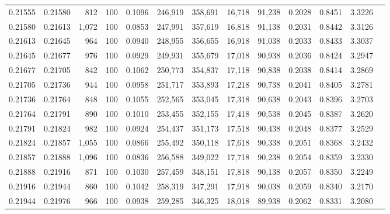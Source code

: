 \begin{tabular}{rrrrrrrrrrrrr}
0.21555 & 0.21580 &   812 & 100 &                                     0.1096 & 246,919 & 358,691 &  16,718 &  91,238 & 0.2028 & 0.8451 & 3.3226 \\
0.21580 & 0.21613 & 1,072 & 100 &                                     0.0853 & 247,991 & 357,619 &  16,818 &  91,138 & 0.2031 & 0.8442 & 3.3126 \\
0.21613 & 0.21645 &   964 & 100 &                                     0.0940 & 248,955 & 356,655 &  16,918 &  91,038 & 0.2033 & 0.8433 & 3.3037 \\
0.21645 & 0.21677 &   976 & 100 &                                     0.0929 & 249,931 & 355,679 &  17,018 &  90,938 & 0.2036 & 0.8424 & 3.2947 \\
0.21677 & 0.21705 &   842 & 100 &                                     0.1062 & 250,773 & 354,837 &  17,118 &  90,838 & 0.2038 & 0.8414 & 3.2869 \\
0.21705 & 0.21736 &   944 & 100 &                                     0.0958 & 251,717 & 353,893 &  17,218 &  90,738 & 0.2041 & 0.8405 & 3.2781 \\
0.21736 & 0.21764 &   848 & 100 &                                     0.1055 & 252,565 & 353,045 &  17,318 &  90,638 & 0.2043 & 0.8396 & 3.2703 \\
0.21764 & 0.21791 &   890 & 100 &                                     0.1010 & 253,455 & 352,155 &  17,418 &  90,538 & 0.2045 & 0.8387 & 3.2620 \\
0.21791 & 0.21824 &   982 & 100 &                                     0.0924 & 254,437 & 351,173 &  17,518 &  90,438 & 0.2048 & 0.8377 & 3.2529 \\
0.21824 & 0.21857 & 1,055 & 100 &                                     0.0866 & 255,492 & 350,118 &  17,618 &  90,338 & 0.2051 & 0.8368 & 3.2432 \\
0.21857 & 0.21888 & 1,096 & 100 &                                     0.0836 & 256,588 & 349,022 &  17,718 &  90,238 & 0.2054 & 0.8359 & 3.2330 \\
0.21888 & 0.21916 &   871 & 100 &                                     0.1030 & 257,459 & 348,151 &  17,818 &  90,138 & 0.2057 & 0.8350 & 3.2249 \\
0.21916 & 0.21944 &   860 & 100 &                                     0.1042 & 258,319 & 347,291 &  17,918 &  90,038 & 0.2059 & 0.8340 & 3.2170 \\
0.21944 & 0.21976 &   966 & 100 &                                     0.0938 & 259,285 & 346,325 &  18,018 &  89,938 & 0.2062 & 0.8331 & 3.2080 \\

\end{tabular}
